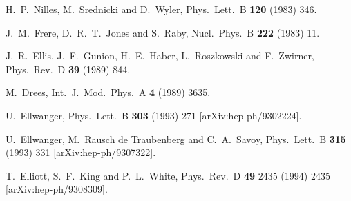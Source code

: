 \documentclass[aps,prl,twocolumn,nofootinbib,superscriptaddress]{revtex4}
\begin{document}
%
%

\def\Journal#1#2#3#4{{#1} {\bf #2}, #3 (#4)}
\def\NCA{Nuovo Cimento}
\def\NIM{Nucl. Instrum. Methods}
\def\NIMA{{Nucl. Instrum. Methods} A}
\def\NP{Nucl. Phys.} 
\def\NPB{{Nucl. Phys.} B}
\def\PLB{{Phys. Lett.}  B}
\def\PRL{Phys. Rev. Lett.}
\def\RPP{Rep. Prog. Phys.}
\def\PRD{{Phys. Rev.} D}
\def\PR{Phys. Rep.}
\def\PRP{Prog. Theor. Phys.}
\def\ZPC{{Z. Phys.} C}
\def\MPL{{Mod. Phys. Lett.} A}
\def\EPJC{{Eur. Phys. J.} C}
\def\CPC{Comput. Phys. Commun.}

\renewcommand{\baselinestretch}{1}

\begin{thebibliography}{99}

  H.~P.~Nilles, M.~Srednicki and D.~Wyler,
  Phys.\ Lett.\  B {\bf 120} (1983) 346.

  J.~M.~Frere, D.~R.~T.~Jones and S.~Raby,
  Nucl.\ Phys.\  B {\bf 222} (1983) 11.


  J.~R.~Ellis, J.~F.~Gunion, H.~E.~Haber, L.~Roszkowski and F.~Zwirner,
  Phys.\ Rev.\  D {\bf 39} (1989) 844.

  M.~Drees,
  Int.\ J.\ Mod.\ Phys.\  A {\bf 4} (1989) 3635.

  U.~Ellwanger,
  Phys.\ Lett.\  B {\bf 303} (1993) 271
  [arXiv:hep-ph/9302224].

  U.~Ellwanger, M.~Rausch de Traubenberg and C.~A.~Savoy,
  Phys.\ Lett.\  B {\bf 315} (1993) 331
  [arXiv:hep-ph/9307322].

  T.~Elliott, S.~F.~King and P.~L.~White,
  Phys.\ Rev.\  D {\bf 49} 2435 (1994) 2435
  [arXiv:hep-ph/9308309].


\end{thebibliography}
\end{document}
